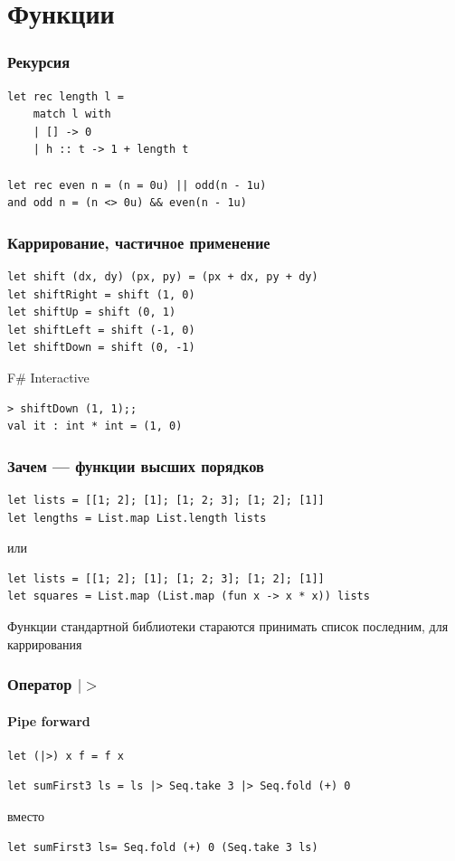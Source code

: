 \documentclass[xetex,mathserif,serif]{beamer}
\begin{document}
	\section{Функции}

	\begin{frame}[fragile]
		\frametitle{Рекурсия}
		\begin{verbatim}
let rec length l =
    match l with
    | [] -> 0
    | h :: t -> 1 + length t

let rec even n = (n = 0u) || odd(n - 1u)
and odd n = (n <> 0u) && even(n - 1u)
		\end{verbatim}
	\end{frame}

	\begin{frame}[fragile]
		\frametitle{Каррирование, частичное применение}
		\begin{verbatim}
let shift (dx, dy) (px, py) = (px + dx, py + dy)
let shiftRight = shift (1, 0)
let shiftUp = shift (0, 1)
let shiftLeft = shift (-1, 0)
let shiftDown = shift (0, -1)
		\end{verbatim}
		\begin{alertblock}{F\# Interactive}
			\begin{verbatim}
> shiftDown (1, 1);;
val it : int * int = (1, 0)
			\end{verbatim}
		\end{alertblock}
	\end{frame}

	\begin{frame}[fragile]
		\frametitle{Зачем --- функции высших порядков}
		\begin{verbatim}
let lists = [[1; 2]; [1]; [1; 2; 3]; [1; 2]; [1]]
let lengths = List.map List.length lists
		\end{verbatim}
		или
		\begin{verbatim}
let lists = [[1; 2]; [1]; [1; 2; 3]; [1; 2]; [1]]
let squares = List.map (List.map (fun x -> x * x)) lists
		\end{verbatim}
		\vspace{3mm}
		Функции стандартной библиотеки стараются принимать список последним, для каррирования
	\end{frame}

	\begin{frame}[fragile]
		\frametitle{Оператор $|>$}
		\framesubtitle{Pipe forward}
		\begin{verbatim}
let (|>) x f = f x
		\end{verbatim}

		\begin{verbatim}
let sumFirst3 ls = ls |> Seq.take 3 |> Seq.fold (+) 0
		\end{verbatim}
		вместо
		\begin{verbatim}
let sumFirst3 ls= Seq.fold (+) 0 (Seq.take 3 ls)
		\end{verbatim}
	\end{frame}
\end{document}
